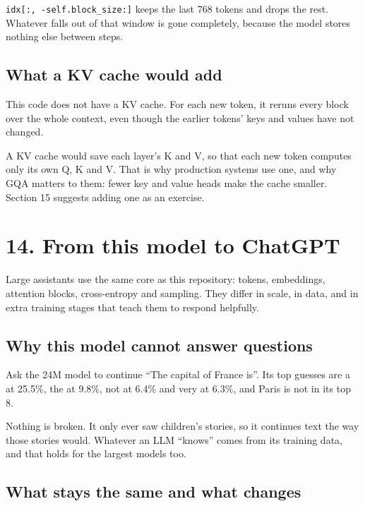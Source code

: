 \documentclass[11pt,a4paper]{article}
\newcommand{\vs}{\textvisiblespace}
\newcommand{\code}[1]{\texttt{#1}}
\begin{document}
\code{idx[:,\allowbreak{} -self.\allowbreak{}block\_\allowbreak{}size:]} keeps the last 768 tokens and drops the rest. Whatever falls out of that window is gone completely, because the model stores nothing else between steps.

\subsection*{What a KV cache would add}
{}

This code does not have a KV cache. For each new token, it reruns every block over the whole context, even though the earlier tokens' keys and values have not changed.

A KV cache would save each layer's K and V, so that each new token computes only its own Q, K and V. That is why production systems use one, and why GQA matters to them: fewer key and value heads make the cache smaller. Section 15 suggests adding one as an exercise.

\section*{14. From this model to ChatGPT}
{}

Large assistants use the same core as this repository: tokens, embeddings, attention blocks, cross-entropy and sampling. They differ in scale, in data, and in extra training stages that teach them to respond helpfully.

\subsection*{Why this model cannot answer questions}
{}

Ask the 24M model to continue “The capital of France is”. Its top guesses are \vs{}a at 25.5\%, \vs{}the at 9.8\%, \vs{}not at 6.4\% and \vs{}very at 6.3\%, and \vs{}Paris is not in its top 8.

Nothing is broken. It only ever saw children's stories, so it continues text the way those stories would. Whatever an LLM “knows” comes from its training data, and that holds for the largest models too.

\subsection*{What stays the same and what changes}
{}
\end{document}
